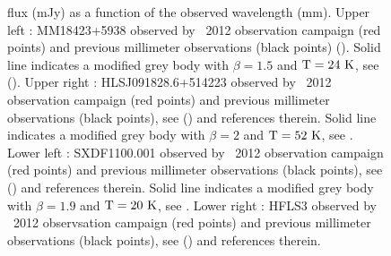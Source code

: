 \begin{figure}[t]
\begin{center}
{flux (mJy) as a function of the observed wavelength (mm). 
Upper left : MM18423+5938 observed by \NIKA\ 2012 observation campaign (red points) and previous millimeter observations 
(black points) (\cite{Lestrade:2010wm}). 
Solid line indicates a modified grey body with $\beta=1.5$ and $\rm T=24  \ {\rm K}$, see (\cite{McKean:2011nk}). 
Upper right :  HLSJ091828.6+514223 observed by \NIKA\ 2012 observation campaign (red points) and previous millimeter 
observations (black points), see (\cite{2012A&A...538L...4C}) and references therein. 
Solid line indicates a modified grey body with $\beta=2$ and $\rm T=52  \ {\rm K}$, see 
\citep{2012A&A...538L...4C}.
Lower left : SXDF1100.001 observed by \NIKA\ 2012 observation campaign (red points) and previous millimeter observations  
(black points), see (\cite{Ikarashi:2010ar}) and references therein. 
Solid line indicates a modified grey body with $\beta=1.9$ and $\rm T=20  \ {\rm K}$, see 
\citep{Ikarashi:2010ar}.
Lower right : HFLS3 observed by \NIKA\ 2012 observsation campaign (red points) and previous millimeter observations  (black points), see (\cite{2013Natur.496..329R}) and references therein.}
\label{fig:sedpointlikesources}
\end{center}
\end{figure} 


